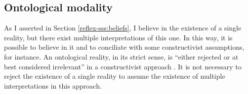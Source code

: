
        


        

\subsection{Ontological modality}

As I asserted in Section \ref{reflex-sss:beliefs}, I believe in the existence of a single reality, but there exist multiple interpretations of this one. In this way, it is possible to believe in it and to conciliate with some constructivist assumptions, for instance. An ontological reality, in its strict sense, is “either rejected or at best considered irrelevant” in a constructivist approach \cite[p.~50]{ben-ari:2001}. It is not necessary to reject the existence of a single reality to assume the existence of multiple interpretations in this approach. 

